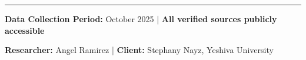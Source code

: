 \documentclass[12pt,letterpaper]{article}
\begin{document}
\vspace{0.5cm}

\noindent\rule{\textwidth}{0.4pt}

\textbf{Data Collection Period:} October 2025 | \textbf{All verified sources publicly accessible}

\textbf{Researcher:} Angel Ramirez | \textbf{Client:} Stephany Nayz, Yeshiva University
\end{document}
